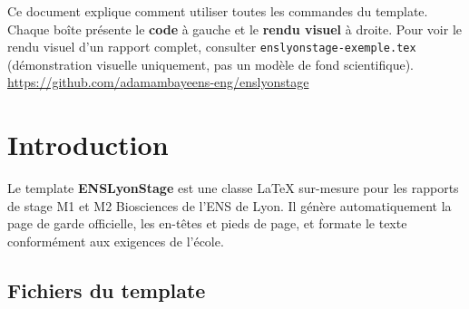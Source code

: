 \documentclass[12pt, a4paper]{article}
\begin{document}
\begin{titlepage}
  \vfill
  \begin{tcolorbox}[colback=ENSbg, colframe=ENSorange!40, width=0.85\linewidth,
                    left=8pt, right=8pt]
    \small\sffamily
    Ce document explique comment utiliser toutes les commandes du template.
    Chaque boîte présente le \textbf{code} à gauche et le \textbf{rendu visuel}
    à droite. Pour voir le rendu visuel d'un rapport complet, consulter
    \texttt{enslyonstage-exemple.tex} (démonstration visuelle uniquement,
    pas un modèle de fond scientifique).\\[4pt]
    \textcolor{ENSaccent}{\url{https://github.com/adamambayeens-eng/enslyonstage}}
  \end{tcolorbox}
\end{titlepage}

\tableofcontents
\clearpage

\section{Introduction}

Le template \textbf{ENSLyonStage} est une classe \LaTeX{} sur-mesure pour
les rapports de stage M1 et M2 Biosciences de l'ENS de Lyon. Il génère
automatiquement la page de garde officielle, les en-têtes et pieds de page,
et formate le texte conformément aux exigences de l'école.

\subsection{Fichiers du template}
\end{document}
